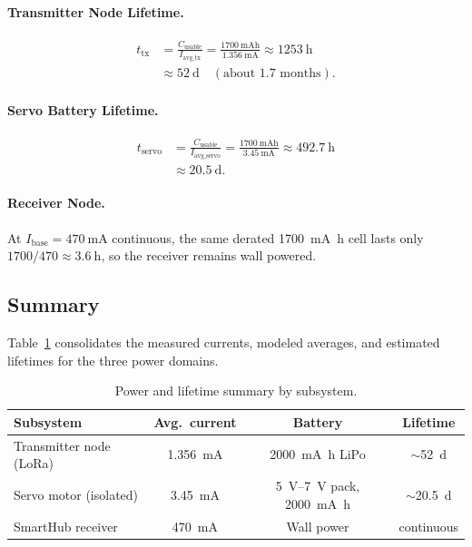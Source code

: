 \documentclass[11pt,letterpaper]{article}
\begin{document}
\paragraph{Transmitter Node Lifetime.}
\begin{align*}
t_{\text{tx}}
&= \frac{C_{\text{usable}}}{I_{\text{avg\_tx}}}
 = \frac{\SI{1700}{\milli\ampere\hour}}{\SI{1.356}{\milli\ampere}}
 \approx \SI{1253}{\hour} \\[2pt]
&\approx \SI{52}{\day}\quad(\text{about } 1.7\text{ months}).
\end{align*}

\paragraph{Servo Battery Lifetime.}
\begin{align*}
t_{\text{servo}}
&= \frac{C_{\text{usable}}}{I_{\text{avg\_servo}}}
 = \frac{\SI{1700}{\milli\ampere\hour}}{\SI{3.45}{\milli\ampere}}
 \approx \SI{492.7}{\hour} \\[2pt]
&\approx \SI{20.5}{\day}.
\end{align*}

\paragraph{Receiver Node.}
At \(I_{\text{base}} = \SI{470}{\milli\ampere}\) continuous, the same
derated \SI{1700}{\milli\ampere\hour} cell lasts only
\(1700/470 \approx \SI{3.6}{\hour}\), so the receiver remains wall
powered.

\subsection{Summary}
Table~\ref{tab:power-summary} consolidates the measured currents,
modeled averages, and estimated lifetimes for the three power
domains.

\begin{table}[H]
    \centering
    \caption{Power and lifetime summary by subsystem.}
    \label{tab:power-summary}
    \small
    \begin{tabular}{@{}l c c c@{}}
        \toprule
        \textbf{Subsystem} & \textbf{Avg.\ current} &
        \textbf{Battery} & \textbf{Lifetime} \\
        \midrule
        Transmitter node (LoRa)
            & \SI{1.356}{\milli\ampere}
            & \SI{2000}{\milli\ampere\hour} LiPo
            & $\sim$\SI{52}{\day} \\
        Servo motor (isolated)
            & \SI{3.45}{\milli\ampere}
            & \SIrange{5}{7}{\volt} pack, \SI{2000}{\milli\ampere\hour}
            & $\sim$\SI{20.5}{\day} \\
        SmartHub receiver
            & \SI{470}{\milli\ampere}
            & Wall power
            & continuous \\
        \bottomrule
    \end{tabular}
\end{table}
\end{document}
